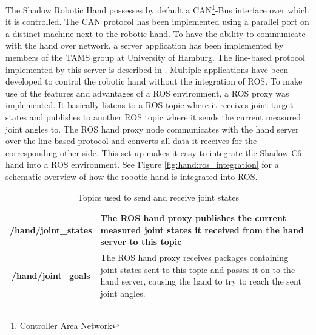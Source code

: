 The Shadow Robotic Hand possesses by default a CAN\footnote{Controller Area Network}-Bus interface over which it is controlled\cite{web:robothand:spec}. The CAN protocol has been implemented using a parallel port on a distinct machine next to the robotic hand. To have the ability to communicate with the hand over network, a server application has been implemented by members of the TAMS group at University of Hamburg. The line-based protocol implemented by this server is described in %
. Multiple applications have been developed to control the robotic hand without the integration of ROS. To make use of the features and advantages of a ROS environment, a ROS proxy was implemented. It basically listens to a ROS topic where it receives joint target states and publishes to another ROS topic where it sends the current measured joint angles to. The ROS hand proxy node communicates with the hand server over the line-based protocol and converts all data it receives for the corresponding other side. This set-up makes it easy to integrate the Shadow C6 hand into a ROS environment. See Figure \ref{fig:hand:ros_integration} for a schematic overview of how the robotic hand is integrated into ROS.

\begin{table}
	\caption{\label{tab:rosmsg:topics}Topics used to send and receive joint states}
	\begin{tabularx}{\linewidth}{|c|X|}
		\hline
		\textbf{/hand/joint\_states} & The ROS hand proxy publishes the current measured joint states it received from the hand server to this topic \\
		\hline
		\textbf{/hand/joint\_goals} & The ROS hand proxy receives packages containing joint states sent to this topic and passes it on to the hand server, causing the hand to try to reach the sent joint angles. \\
		\hline
	\end{tabularx}
\end{table}

